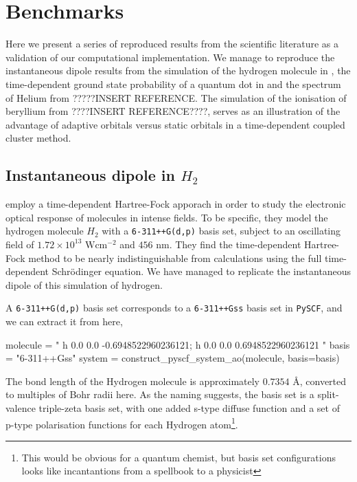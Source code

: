 \chapter{Benchmarks}

Here we present a series of reproduced results from the scientific literature as 
a validation of our computational implementation. We manage to reproduce the 
instantaneous dipole results from the simulation of the 
hydrogen molecule in \citeauthor{li2005time}\cite{li2005time},
the time-dependent ground state probability of a quantum dot in 
\citeauthor{Zanghellini04}\cite{Zanghellini04}
and the spectrum of Helium from ?????INSERT REFERENCE.
The simulation of the ionisation of beryllium 
from ????INSERT REFERENCE????, serves as an illustration of the advantage of
adaptive orbitals versus static orbitals in a time-dependent coupled cluster method.


\section{Instantaneous dipole in $H_2$}

\citeauthor{li2005time}\cite{li2005time} employ a time-dependent Hartree-Fock 
apporach in order to study the electronic optical response of molecules 
in intense fields. To be specific, they model the hydrogen molecule $H_2$ 
with a \lstinline{6-311++G(d,p)} basis set, subject to an oscillating field 
of $1.72\times10^13\text{ W} \text{cm}^{-2}$ and $456\text{ nm}$. They find the time-dependent
Hartree-Fock method to be nearly indistinguishable from calculations using the 
full time-dependent Schrödinger equation. We have managed to replicate the 
instantaneous dipole of this simulation of hydrogen.

A \lstinline{6-311++G(d,p)} basis set corresponds to a \lstinline{6-311++Gss} 
basis set in \lstinline{PySCF}, and we can extract it from here,
\begin{python}
molecule = "
    h 0.0 0.0 -0.6948522960236121;
    h 0.0 0.0  0.6948522960236121
    "
basis = "6-311++Gss"
system = construct_pyscf_system_ao(molecule, basis=basis)
\end{python}
The bond length of the Hydrogen molecule is approximately $0.7354\text{ Å}$, converted 
to multiples of Bohr radii here. As the naming suggests, the basis set is a split-valence 
triple-zeta basis set, with one added s-type diffuse function and a set of p-type
polarisation 
functions for each Hydrogen atom\footnote{This would be obvious for a quantum chemist,
but basis set configurations looks like incantantions from a spellbook to a physicist}.

